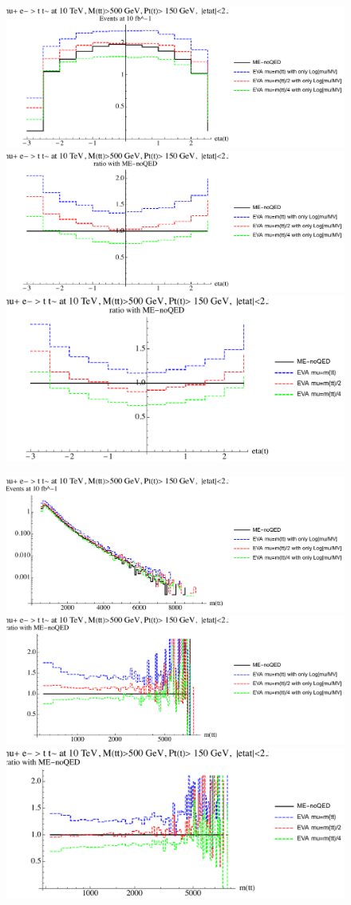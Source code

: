 \documentclass[a4paper,11pt]{article}
\begin{document}
\begin{figure}[ht]
\includegraphics[width=0.4\linewidth]{PlotDistr/ZZ_tt/10TeVcuts/plotetat.pdf}
\includegraphics[width=0.4\linewidth]{PlotDistr/ZZ_tt/10TeVcuts/plotetatratio1.pdf}
\includegraphics[width=0.4\linewidth]{PlotDistr/ZZ_tt/10TeVcuts/plotetatratio2.pdf}
\end{figure}

\begin{figure}[ht]
\includegraphics[width=0.4\linewidth]{PlotDistr/ZZ_tt/10TeVcuts/plotmtt.pdf}
\includegraphics[width=0.4\linewidth]{PlotDistr/ZZ_tt/10TeVcuts/plotmttratio1.pdf}
\includegraphics[width=0.4\linewidth]{PlotDistr/ZZ_tt/10TeVcuts/plotmttratio2.pdf}
\end{figure}
\end{document}
